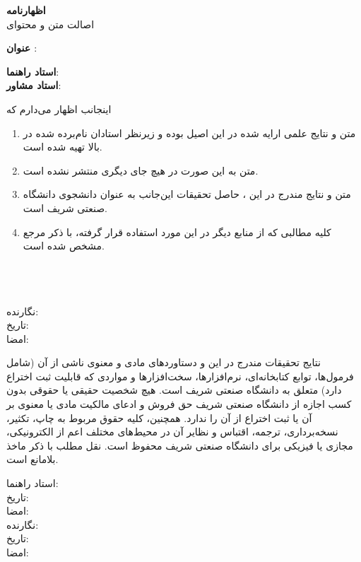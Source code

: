 
{\parindent0pt

\begin{center}
{\LARGE\bf اظهارنامه} \\
{\small اصالت متن و محتوای \ThesisType{}}
\end{center}

\textbf{عنوان ‌\ThesisType}: \ThesisTitle

\vspace{.1em}
{\textbf{استاد راهنما}: \ThesisSupervisor} \\
{\textbf{استاد مشاور}: \ThesisAdvisor}

\vspace{0.75em}
اینجانب {\ThesisAuthor} اظهار می‌دارم که
\begin{enumerate}
\item
 متن و نتایج علمی ارایه شده در این \ThesisType{} اصیل بوده و زیرنظر استادان نام‌برده ‌شده در بالا تهیه شده است.
\item
متن \ThesisType{} به این صورت در هیچ جای دیگری منتشر نشده است.
\item
متن و نتایج مندرج در این \ThesisType، حاصل تحقیقات این‌جانب به عنوان دانشجوی \ThesisDegree{} دانشگاه صنعتی شریف است.
\item
کلیه مطالبی که از منابع دیگر در این \ThesisType{} مورد استفاده قرار گرفته، با ذکر مرجع مشخص شده است.
\end{enumerate}

\begin{multicols}{2}
\ \\
\ \\
\ \\

نگارنده: \ThesisAuthor \\
تاریخ: \\
امضا: \\
\end{multicols}

نتایج تحقیقات مندرج در این \ThesisType{} و دستاوردهای مادی و معنوی ناشی از آن (شامل فرمول‌ها، توابع کتابخانه‌ای، نرم‌افزارها، سخت‌افزارها و مواردی که قابلیت ثبت اختراع دارد) متعلق به دانشگاه صنعتی شریف است. هیچ شخصیت حقیقی یا حقوقی بدون کسب اجازه از دانشگاه صنعتی شریف حق فروش و ادعای مالکیت مادی یا معنوی بر آن یا ثبت اختراع از آن را ندارد. همچنین، کلیه حقوق مربوط به چاپ، تکثیر، نسخه‌برداری، ترجمه، اقتباس و نظایر آن در محیط‌های مختلف اعم از الکترونیکی، مجازی یا فیزیکی برای دانشگاه صنعتی شریف محفوظ است. نقل مطلب با ذکر ماخذ بلامانع است.


\begin{multicols}{2}
استاد راهنما: \ThesisSupervisor \\
تاریخ: \\
امضا: \\

نگارنده: \ThesisAuthor \\
تاریخ: \\
امضا: \\
\end{multicols}
}

